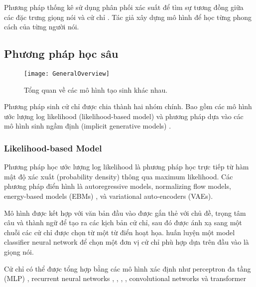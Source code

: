 Phương pháp thống kê sử dụng phân phối xác suất để tìm sự tương đồng giữa các đặc trưng giọng nói và cử chỉ \cite{levine2010gesture}. Tác giả \cite{neff2008gesture} xây dựng mô hình để học từng phong cách của từng người nói.

\subsection{Phương pháp học sâu}

\setcounter{figure}{3}
\begin{figure}[H]
	\centering
	\texttt{[image: GeneralOverview]}
	\caption{Tổng quan về các mô hình tạo sinh khác nhau.}
	\label{fig:GeneralOverview}
\end{figure}

Phương pháp sinh cử chỉ được chia thành hai nhóm chính. Bao gồm các mô hình ước lượng log likelihood (likelihood-based model)  và phương pháp dựa vào các mô hình sinh ngầm định (implicit generative models) \cite{song2021score}. 

\subsubsection{Likelihood-based Model}

Phương pháp học ước lượng log likelihood là phương pháp học trực tiếp từ hàm mật độ xác xuất (probability density) thông qua maximum likelihood. Các phương pháp điển hình là autoregressive models, normalizing flow models, energy-based models (EBMs)
, và variational auto-encoders (VAEs).


Mô hình được kết hợp với văn bản đầu vào được gắn thẻ với chủ đề, trọng tâm câu và thành ngữ để tạo ra các kịch bản cử chỉ, sau đó được ánh xạ sang một chuỗi các cử chỉ được chọn từ một từ điển hoạt họa. \cite{chiu2015predicting} huấn luyện một model classifier neural network để chọn một đơn vị cử chỉ phù hợp dựa trên đầu vào là giọng nói. 

Cử chỉ có thể được tổng hợp bằng các mô hình xác định như perceptron đa tầng (MLP) \cite{kucherenko2020gesticulator}, recurrent neural networks \cite{bhattacharya2021speech2affectivegestures}, \cite{liu2022learning}, \cite{hasegawa2018evaluation}, \cite{yoon2020speech}, convolutional networks \cite{habibie2021learning} và transformer \cite{bhattacharya2021text2gestures} 


